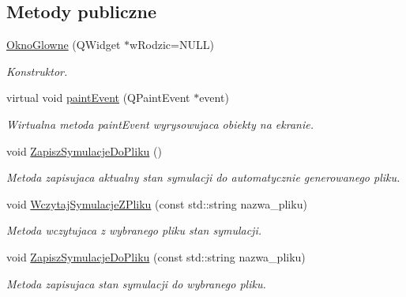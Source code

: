 \subsection*{Metody publiczne}
\begin{DoxyCompactItemize}
\item 
\hyperlink{class_okno_glowne_a8dcfe4e0f18dfaf0c535c4549991b550}{Okno\+Glowne} (Q\+Widget $\ast$w\+Rodzic=N\+U\+L\+L)
\begin{DoxyCompactList}\small\item\em Konstruktor. \end{DoxyCompactList}\item 
virtual void \hyperlink{class_okno_glowne_a570c795e3829c3bd7896551c0624abe2}{paint\+Event} (Q\+Paint\+Event $\ast$event)
\begin{DoxyCompactList}\small\item\em Wirtualna metoda paint\+Event wyrysowujaca obiekty na ekranie. \end{DoxyCompactList}\item 
void \hyperlink{class_okno_glowne_a6062f76fdf15ad8bc0543cfd2a2fe150}{Zapisz\+Symulacje\+Do\+Pliku} ()
\begin{DoxyCompactList}\small\item\em Metoda zapisujaca aktualny stan symulacji do automatycznie generowanego pliku. \end{DoxyCompactList}\item 
void \hyperlink{class_okno_glowne_a1b8098c27e9656235bb056aeb79a8ece}{Wczytaj\+Symulacje\+Z\+Pliku} (const std\+::string nazwa\+\_\+pliku)
\begin{DoxyCompactList}\small\item\em Metoda wczytujaca z wybranego pliku stan symulacji. \end{DoxyCompactList}\item 
void \hyperlink{class_okno_glowne_ac57587eba95f28512d71705a87f8a508}{Zapisz\+Symulacje\+Do\+Pliku} (const std\+::string nazwa\+\_\+pliku)
\begin{DoxyCompactList}\small\item\em Metoda zapisujaca stan symulacji do wybranego pliku. \end{DoxyCompactList}\end{DoxyCompactItemize}
